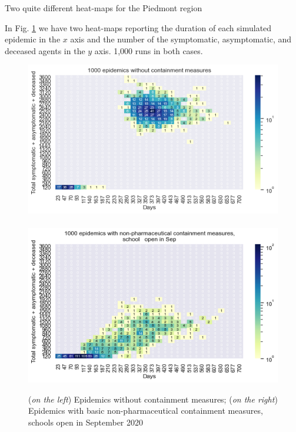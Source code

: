 \documentclass[8pt]{beamer}
\begin{document}
\begin{frame}{Two quite different heat-maps for the Piedmont region}

In Fig. \ref{2HM} we have two heat-maps reporting the duration of each simulated epidemic in the $x$ axis and the number of the symptomatic, asymptomatic, and deceased agents in the $y$ axis. 1,000 runs in both cases.

\begin{figure}[H]
\center
\includegraphics[scale=0.3]{HM30_readRunResults1k_noControl_plusHMlog.png}~~~\includegraphics[scale=0.3]{HM30_readRunResults1k_basicControl_schoolOpenSept_plusHMlog.png} 

\caption{(\emph{on the left}) Epidemics without containment measures;
 (\emph{on the right}) Epidemics with basic non-pharmaceutical containment measures, schools open in September 2020} 
\label{2HM}
\end{figure}


\end{frame}
\end{document}
